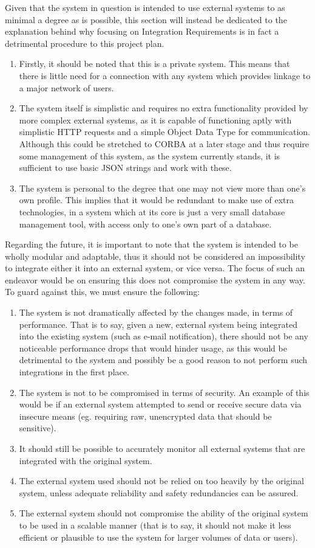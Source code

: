 \documentclass[hidelinks,a4paper,12pt]{article}
\begin{document}
	Given that the system in question is intended to use external systems to as minimal a degree as is possible, this section will instead be dedicated to the explanation behind why focusing on Integration Requirements is in fact a detrimental procedure to this project plan.
	
	\begin{enumerate}
		\item Firstly, it should be noted that this is a private system. This means that there is little need for a connection with any system which provides linkage to a major network of users.
		\item The system itself is simplistic and requires no extra functionality provided by more complex external systems, as it is capable of functioning aptly with simplistic HTTP requests and a simple Object Data Type for communication. Although this could be stretched to CORBA at a later stage and thus require some management of this system, as the system currently stands, it is sufficient to use basic JSON strings and work with these.
		\item The system is personal to the degree that one may not view more than one's own profile. This implies that it would be redundant to make use of extra technologies, in a system which at its core is just a very small database management tool, with access only to one's own part of a database.
	\end{enumerate}
	Regarding the future, it is important to note that the system is intended to be wholly modular and adaptable, thus it should not be considered an impossibility to integrate either it into an external system, or vice versa. The focus of such an endeavor would be on ensuring this does not compromise the system in any way. To guard against this, we must ensure the following:
	\begin{enumerate}
		\item The system is not dramatically affected by the changes made, in terms of performance. That is to say, given a new, external system being integrated into the existing system (such as e-mail notification), there should not be any noticeable performance drops that would hinder usage, as this would be detrimental to the system and possibly be a good reason to not perform such integrations in the first place.
		\item The system is not to be compromised in terms of security. An example of this would be if an external system attempted to send or receive secure data via insecure means (eg. requiring raw, unencrypted data that should be sensitive).
		\item It  should still be possible to accurately monitor all external systems that are integrated with the original system.
		\item The external system used should not be relied on too heavily by the original system, unless adequate reliability and safety redundancies can be assured.
		\item The external system should not compromise the ability of the original system to be used in a scalable manner (that is to say, it should not make it less efficient or plausible to use the system for larger volumes of data or users).
	\end{enumerate}
\end{document}
